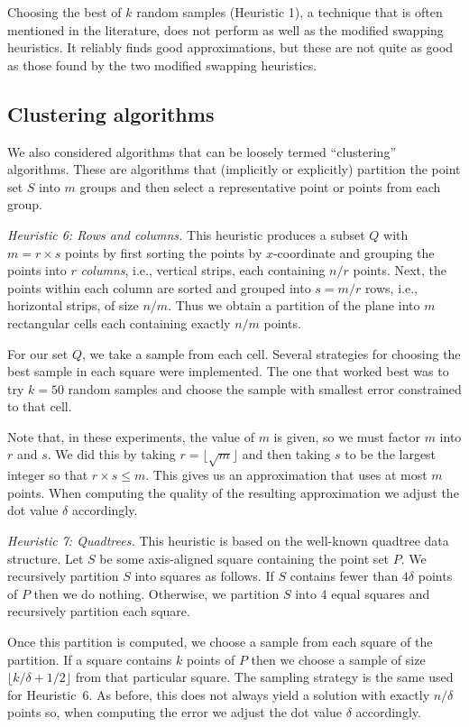 \documentclass{elsart}
\begin{document}
Choosing the best of $k$ random samples (Heuristic 1), a technique
that is often mentioned in the literature, does not perform as well as
the modified swapping heuristics.  It reliably finds good
approximations, but these are not quite as good as those found by the
two modified swapping heuristics.

\subsection{Clustering algorithms}

We also considered algorithms that can be loosely termed
``clustering'' algorithms.  These are algorithms that (implicitly or
explicitly) partition the point set $S$ into $m$ groups and then
select a representative point or points from each group.

\emph{Heuristic 6: Rows and columns.} This heuristic produces a
subset $Q$ with $m=r\times s$ points by first sorting the points by
$x$-coordinate and grouping the points into $r$ \emph{columns}, i.e.,
vertical strips, each containing $n/r$ points.  Next, the points
within each column are sorted and grouped into $s=m/r$ rows, i.e.,
horizontal strips, of size $n/m$.  Thus we obtain a partition of the
plane into $m$ rectangular cells each containing exactly $n/m$ points.  

For our set $Q$, we take a sample from each cell.  Several strategies
for choosing the best sample in each square were implemented.  The one
that worked best was to try $k=50$ random samples and choose the
sample with smallest error constrained to that cell.  

Note that, in these experiments, the value of $m$ is given, so we must
factor $m$ into $r$ and $s$.  We did this by taking
$r=\lfloor\sqrt{m}\rfloor$ and then taking $s$ to be the largest
integer so that $r\times s\le m$.  This gives us an approximation that
uses at most $m$ points. When computing the quality of the resulting
approximation we adjust the dot value $\delta$ accordingly. 

\emph{Heuristic 7: Quadtrees.}
This heuristic is based on the well-known quadtree data structure.
Let $S$ be some axis-aligned square containing the point set $P$.  We
recursively partition $S$ into squares as follows.  If $S$ contains
fewer than $4\delta$ points of $P$ then we do nothing.  Otherwise, we
partition $S$ into 4 equal squares and recursively partition each
square.

Once this partition is computed, we choose a sample from each square
of the partition.  If a square contains $k$ points of $P$ then we
choose a sample of size $\lfloor k/\delta+1/2\rfloor$ from that
particular square.  The sampling strategy is the same used for
Heuristic~6.  As before, this does not always yield a solution with
exactly $n/\delta$ points so, when computing the error we adjust the
dot value $\delta$ accordingly.
\end{document}

